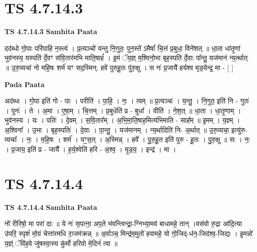 \documentclass[17pt]{extarticle}
\begin{document}
\section*{ TS 4.7.14.3 }

\textbf{TS 4.7.14.3 } \newline
\textbf{Samhita Paata} \newline

दद॑ब्धो गो॒पाः परि॑पाहि न॒स्त्वं । प्र॒त्यञ्चो॑ यन्तु नि॒गुतः॒ पुन॒स्ते॑ ऽमैषां᳚ चि॒त्तं प्र॒बुधा॒ विने॑शत् ॥ धा॒ता धा॑तृ॒णां भुव॑नस्य॒ यस्पति॑ र्दे॒वꣳ स॑वि॒तार॑मभि माति॒षाहं᳚ । इ॒मं ॅय॒ज्ञ् म॒श्विनो॒भा बृह॒स्पति॑ र्दे॒वाः पा᳚न्तु॒ यज॑मानं न्य॒र्त्थात् ॥ उ॒रु॒व्यचा॑ नो महि॒षः शर्म॑ यꣳ सद॒स्मिन्. हवे॑ पुरुहू॒तः पु॑रु॒क्षु । स नः॑ प्र॒जायै॑ हर्यश्व मृड॒येन्द्र॒ मा - [  ] \newline

\textbf{Pada Paata} \newline

अद॑ब्धः । गो॒पा इति॑ गो - पाः । परीति॑ । पा॒हि॒ । नः॒ । त्वम् ॥ प्र॒त्यञ्चः॑ । य॒न्तु॒ । नि॒गुत॒ इति॑ नि - गुतः॑ । पुनः॑ । ते । अ॒मा । ए॒षा॒म् । चि॒त्तम् । प्र॒बुधेति॑ प्र - बुधा᳚ । वीति॑ । ने॒श॒त् ॥ धा॒ता । धा॒तृ॒णाम् । भुव॑नस्य । यः । पतिः॑ । दे॒वम् । स॒वि॒तार᳚म् । अ॒भि॒मा॒ति॒षाह॒मित्य॑भिमाति - साह᳚म् ॥ इ॒मम् । य॒ज्ञ्म् । अ॒श्विना᳚ । उ॒भा । बृह॒स्पतिः॑ । दे॒वाः । पा॒न्तु॒ । यज॑मानम् । न्य॒र्थादिति॑ नि- अ॒र्थात् ॥ उ॒रु॒व्यचा॒ इत्यु॑रु-व्यचाः᳚ । नः॒ । म॒हि॒षः । शर्म॑ । यꣳ॒॒स॒त् । अ॒स्मिन्न् । हवे᳚ । पु॒रु॒हू॒त इति॑ पुरु - हू॒तः । पु॒रु॒क्षु ॥ सः । नः॒ । प्र॒जाय॒ इति॑ प्र - जायै᳚ । ह॒र्य॒श्वेति॑ हरि - अ॒श्व॒ । मृ॒ड॒य॒ । इन्द्र॑ । मा ।  \newline




\section*{ TS 4.7.14.4 }

\textbf{TS 4.7.14.4 } \newline
\textbf{Samhita Paata} \newline

नो॑ रीरिषो॒ मा परा॑ दाः ॥ ये नः॑ स॒पत्ना॒ अप॒ते भ॑वन्त्विन्द्रा॒-ग्निभ्या॒मव॑ बाधामहे॒ तान् ।वस॑वो रु॒द्रा आ॑दि॒त्या उ॑परि॒ स्पृशं॑ मो॒ग्रं चेत्ता॑रमधि रा॒जम॑क्रन्न् ॥ अ॒र्वाञ्च॒ मिन्द्र॑म॒मुतो॑ हवामहे॒ यो गो॒जिद्-ध॑न॒-जिद॑श्व॒-जिद्यः । इ॒मन्नो॑ य॒ज्ञ्ं ॅवि॑ह॒वे जु॑षस्वा॒स्य कु॑र्मो हरिवो मे॒दिनं॑ त्वा ॥ \newline
\end{document}
